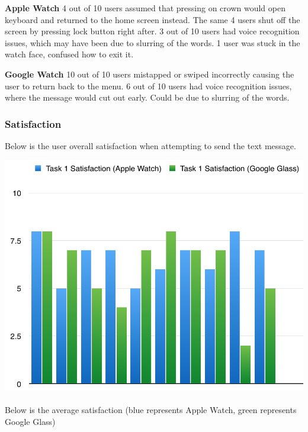 \documentclass[paper=a4, fontsize=11pt]{scrartcl}	%
\numberwithin{equation}{section}															%
\numberwithin{figure}{section}																%
\numberwithin{table}{section}																%
\begin{document}
\textbf{Apple Watch}
4 out of 10 users assumed that pressing on crown would open keyboard and returned to the home screen instead. The same 4 users  shut off the screen by pressing lock button right after.
3 out of 10 users had voice recognition issues, which  may have been due to slurring of the words.
1 user was stuck in the watch face, confused how to exit it.


\textbf{Google Watch}
10 out of 10 users mistapped or swiped incorrectly causing the user to return back to the menu. 
6 out of 10 users had voice recognition issues, where the message would cut out early. Could be due to slurring of the words.


\subsubsection{Satisfaction}
Below is the user overall satisfaction when attempting to send the text message.

\includegraphics[scale=0.8]{task1satisfaction}\\ \\

Below is the average satisfaction (blue represents Apple Watch, green represents Google Glass)\\ \\
\end{document}
